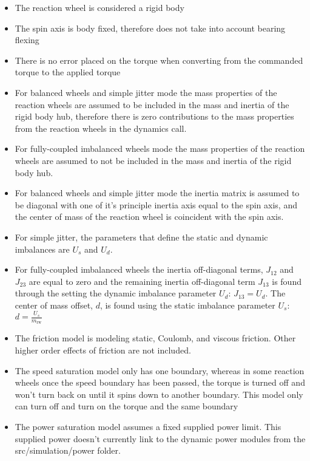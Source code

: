 \begin{itemize}
	\item The reaction wheel is considered a rigid body
	\item The spin axis is body fixed, therefore does not take into account bearing flexing
	\item There is no error placed on the torque when converting from the commanded torque to the applied torque
	\item For balanced wheels and simple jitter mode the mass properties of the reaction wheels are assumed to be included in the mass and inertia of the rigid body hub, therefore there is zero contributions to the mass properties from the reaction wheels in the dynamics call. 
	\item For fully-coupled imbalanced wheels mode the mass properties of the reaction wheels are assumed to not be included in the mass and inertia of the rigid body hub. 
	\item For balanced wheels and simple jitter mode the inertia matrix is assumed to be diagonal with one of it's principle inertia axis equal to the spin axis, and the center of mass of the reaction wheel is coincident with the spin axis. 
	\item For simple jitter, the parameters that define the static and dynamic imbalances are $U_s$ and $U_d$.
	\item For fully-coupled imbalanced wheels the inertia off-diagonal terms, $J_{12}$ and $J_{23}$ are equal to zero and the remaining inertia off-diagonal term $J_{13}$ is found through the setting the dynamic imbalance parameter $U_d$: $J_{13} = U_d$. The center of mass offset, $d$, is found using the static imbalance parameter $U_s$: $d = \frac{U_s}{m_{\text{rw}}}$
	\item The friction model is modeling static, Coulomb, and viscous friction. Other higher order effects of friction are not included. 
	\item The speed saturation model only has one boundary, whereas in some reaction wheels once the speed boundary has been passed, the torque is turned off and won't turn back on until it spins down to another boundary. This model only can turn off and turn on the torque and the same boundary
	\item The power saturation model assumes a fixed supplied power limit. This supplied power doesn't currently link to the dynamic power modules from the src/simulation/power folder.
\end{itemize}